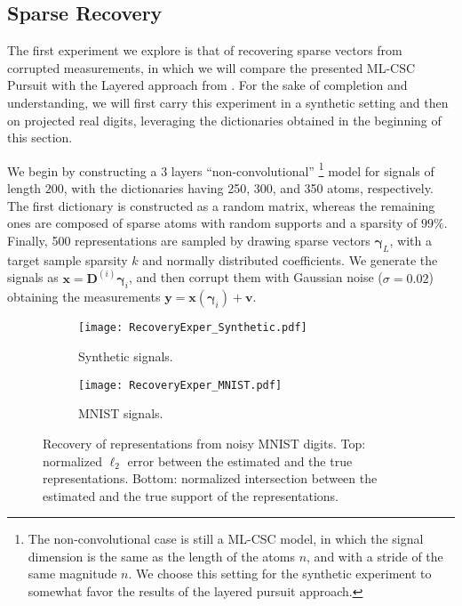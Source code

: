 \documentclass[10pt,journal]{IEEEtran}
\def\x{{\mathbf x}}
\def\v{{\mathbf v}}
\def\y{{\mathbf y}}
\def\D{{\mathbf D}}
\def\gama{{\boldsymbol \gamma}}
\theoremstyle{plain}
\theoremstyle{definition}
\begin{document}
\subsection{Sparse Recovery}

The first experiment we explore is that of recovering sparse vectors from corrupted measurements, in which we will compare the presented ML-CSC Pursuit with the Layered approach from \cite{Papyan2016convolutional}. For the sake of completion and understanding, we will first carry this experiment in a synthetic setting and then on projected real digits, leveraging the dictionaries obtained in the beginning of this section.

We begin by constructing a 3 layers ``non-convolutional'' \footnote{The non-convolutional case is still a ML-CSC model, in which the signal dimension is the same as the length of the atoms $n$, and with a stride of the same magnitude $n$. We choose this setting for the synthetic experiment to somewhat favor the results of the layered pursuit approach.} model for signals of length $200$, with the dictionaries having 250, 300, and 350 atoms, respectively. The first dictionary is constructed as a random matrix, whereas the remaining ones are composed of sparse atoms with random supports and a sparsity of $99\%$. Finally, 500 representations are sampled by drawing sparse vectors $\gama_L$, with a target sample sparsity $k$ and normally distributed coefficients. We generate the signals as $\x = \D^{(i)}\gama_i$, and then corrupt them with Gaussian noise ($\sigma = 0.02$) obtaining the measurements $\y = \x(\gama_i) + \v$. 

\begin{figure}
	\centering
	\begin{subfigure}{.5\textwidth}
		\texttt{[image: RecoveryExper\_Synthetic.pdf]} \\
		\caption{\footnotesize Synthetic signals.}
		\label{fig:SyntheticExperiment}
	\end{subfigure}
		

	\begin{subfigure}{.5\textwidth}
		\texttt{[image: RecoveryExper\_MNIST.pdf]} \\
		\caption{\footnotesize MNIST signals.}
		\label{fig:Recovery_MnistExperiment}
	\end{subfigure}
	\caption{Recovery of representations from noisy MNIST digits. Top: normalized $\ell_2$ error between the estimated and the true representations. Bottom: normalized intersection between the estimated and the true support of the representations.}
\end{figure}
\end{document}
